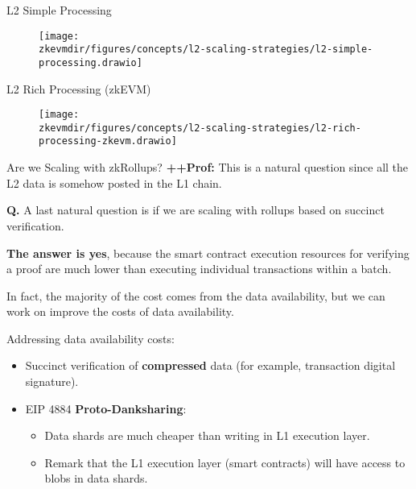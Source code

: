 \begin{frame}{L2 Simple Processing}
\begin{figure}
\texttt{[image: \\zkevmdir/figures/concepts/l2-scaling-strategies/l2-simple-processing.drawio]}
\end{figure}
\end{frame}






\begin{frame}{L2 Rich Processing (zkEVM)}
\begin{figure}
\texttt{[image: \\zkevmdir/figures/concepts/l2-scaling-strategies/l2-rich-processing-zkevm.drawio]}
\end{figure}
\end{frame}






\begin{frame}{Are we Scaling with zkRollups?}
\ifPROF
\footnotesize
\textbf{++Prof:} This is a natural question since all the L2 data is somehow posted in the L1 chain.
\normalsize
\fi

\textbf{Q.} A last natural question is if we are scaling with rollups based on succinct verification.

\textbf{The answer is yes}, because the smart contract execution resources for verifying a proof are much lower
than executing individual transactions within a batch.


In fact, the majority of the cost comes from the data availability, but we can work on improve the costs of data availability.

\vspace{0.2cm}
Addressing data availability costs:
  \begin{itemize}
  \item Succinct verification of \textbf{compressed} data (for example, transaction digital signature).
  \item EIP 4884 \textbf{Proto-Danksharing}:
    \begin{itemize}
    \item Data shards are much cheaper than writing in L1 execution layer.
    \item Remark that the L1 execution layer (smart contracts) will have access to blobs in data shards.
    \end{itemize}
  \end{itemize}
\end{frame}
